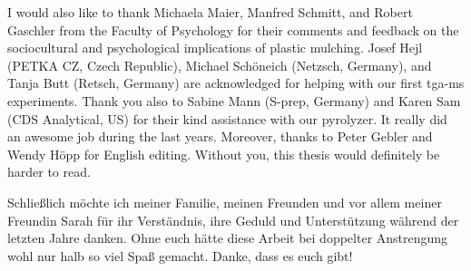 I would also like to thank Michaela Maier, Manfred Schmitt, and Robert Gaschler from the Faculty of Psychology for their comments and feedback on the sociocultural and psychological implications of plastic mulching. Josef Hejl (PETKA CZ, Czech Republic), Michael Schöneich (Netzsch, Germany), and Tanja Butt (Retsch, Germany) are acknowledged for helping with our first \acs{tga-ms} experiments. Thank you also to Sabine Mann (S-prep, Germany) and Karen Sam (CDS Analytical, US) for their kind assistance with our pyrolyzer. It really did an awesome job during the last years. Moreover, thanks to Peter Gebler and Wendy Höpp for English editing. Without you, this thesis would definitely be harder to read.

\vspace{\baselineskip}

\foreignlanguage{ngerman}{Schließlich möchte ich meiner Familie, meinen Freunden und vor allem meiner Freundin Sarah für ihr Verständnis, ihre Geduld und Unterstützung während der letzten Jahre danken. Ohne euch hätte diese Arbeit bei doppelter Anstrengung wohl nur halb so viel Spaß gemacht. Danke, dass es euch gibt!}
